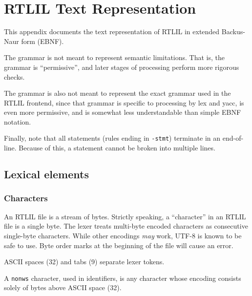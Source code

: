 \chapter{RTLIL Text Representation}
\label{chapter:textrtlil}

\newlength{\myl}

\newenvironment{indentgrammar}[1]
    {\vspace{0.5cm}\hrule
    \setlength{\myl}{\widthof{#1}+2em}
    \grammarindent\the\myl
    \begin{grammar}}
    {\end{grammar}
    \hrule}

This appendix documents the text representation of RTLIL in extended Backus-Naur form (EBNF).

The grammar is not meant to represent semantic limitations. That is, the grammar is ``permissive'', and later stages of processing perform more rigorous checks.

The grammar is also not meant to represent the exact grammar used in the RTLIL frontend, since that grammar is specific to processing by lex and yacc, is even more permissive, and is somewhat less understandable than simple EBNF notation.

Finally, note that all statements (rules ending in \texttt{-stmt}) terminate in an end-of-line. Because of this, a statement cannot be broken into multiple lines.

\section{Lexical elements}

\subsection{Characters}

An RTLIL file is a stream of bytes. Strictly speaking, a ``character'' in an RTLIL file is a single byte. The lexer treats multi-byte encoded characters as consecutive single-byte characters. While other encodings \textit{may} work, UTF-8 is known to be safe to use. Byte order marks at the beginning of the file will cause an error.

ASCII spaces (32) and tabs (9) separate lexer tokens.

A \texttt{nonws} character, used in identifiers, is any character whose encoding consists solely of bytes above ASCII space (32).

